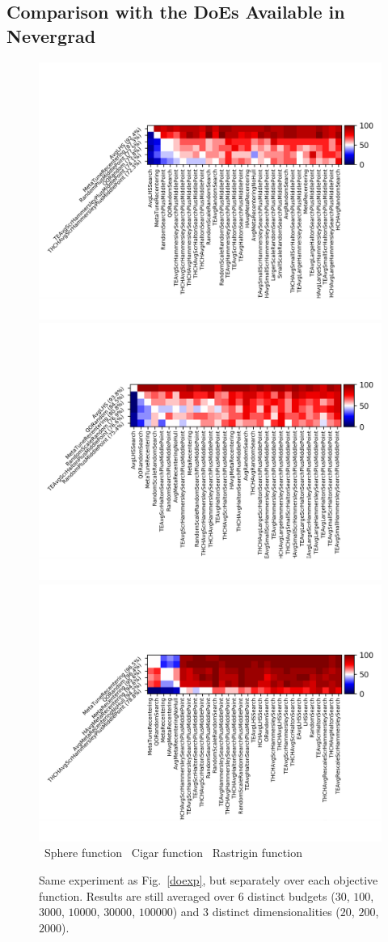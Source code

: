 \subsection{Comparison with the DoEs Available in Nevergrad}%
\label{rg}
%
\begin{figure}[t]
    \centering
\includegraphics[trim={30 25 12 80}, clip,width=.32\textwidth]{sections/appendix/ppsn2020-rescaling/figures/fight_namesphere}      \includegraphics[trim={30 25 12 80}, clip,width=.32\textwidth]{sections/appendix/ppsn2020-rescaling/figures/fight_namecigar.png}     
\includegraphics[trim={30 25 12 80}, clip,width=.32\textwidth]{sections/appendix/ppsn2020-rescaling/figures/fight_namerastrigin.png}   \\ 
~\hfill Sphere function\hfill ~ \hfill Cigar function\hfill ~ \hfill Rastrigin function\hfill ~\\
\caption{Same experiment as Fig.~\ref{doexp}, but separately over each objective function. Results are still averaged over 6 distinct budgets ($30$, $100$, $3000$, $10000$, $30000$, $100000$) and 3 distinct dimensionalities ($20$, $200$, $2000$). }
    \label{toto3}
\end{figure}
%
